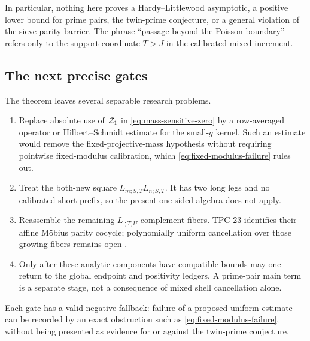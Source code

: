 In particular, nothing here proves a Hardy--Littlewood asymptotic, a
positive lower bound for prime pairs, the twin-prime conjecture, or a
general violation of the sieve parity barrier.  The phrase ``passage
beyond the Poisson boundary'' refers only to the support coordinate
\(T>J\) in the calibrated mixed increment.

\subsection{The next precise gates}

The theorem leaves several separable research problems.
\begin{enumerate}[label=\textup{(\roman*)}]
 \item Replace absolute use of \(\mathcal Z_1\) in
 \eqref{eq:mass-sensitive-zero} by a row-averaged operator or
 Hilbert--Schmidt estimate for the small-\(g\) kernel.  Such an estimate
 would remove the fixed-projective-mass hypothesis without requiring
 pointwise fixed-modulus calibration, which
 \eqref{eq:fixed-modulus-failure} rules out.
 \item Treat the both-new square
 \(L_{m;S,T}L_{n;S,T}\).  It has two long legs and no calibrated short
 prefix, so the present one-sided algebra does not apply.
 \item Reassemble the remaining \(L_{\cdot;T,U}\) complement fibers.
 TPC-23 identifies their affine M\"obius parity cocycle; polynomially
 uniform cancellation over those growing fibers remains open
 \citep{WangTPC23}.
 \item Only after these analytic components have compatible bounds may
 one return to the global endpoint and positivity ledgers.  A
 prime-pair main term is a separate stage, not a consequence of mixed
 shell cancellation alone.
\end{enumerate}

Each gate has a valid negative fallback: failure of a proposed uniform
estimate can be recorded by an exact obstruction such as
\eqref{eq:fixed-modulus-failure}, without being presented as evidence
for or against the twin-prime conjecture.
